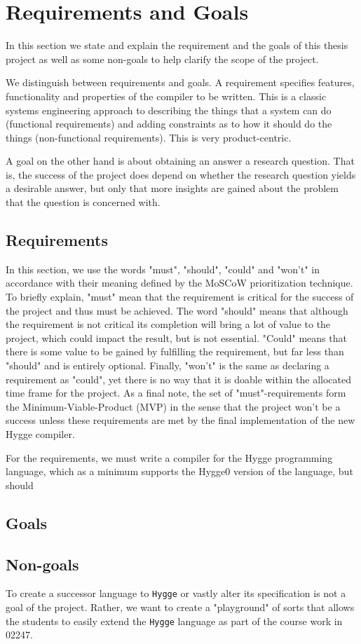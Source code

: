 \chapter{Requirements and Goals} \label{sec:requirements}

In this section we state and explain the requirement and the goals of this thesis project as well as some non-goals to help clarify the scope
of the project.

We distinguish between requirements and goals. A requirement specifies features, functionality and properties of the compiler to be written.
This is a classic systems engineering approach to describing the things that a system can do (functional requirements) and adding constraints as
to how it should do the things (non-functional requirements). This is very product-centric.

A goal on the other hand is about obtaining an answer a research question. That is, the success of the project does depend on whether the research
question yields a desirable answer, but only that more insights are gained about the problem that the question is concerned with.

\section{Requirements}

In this section, we use the words "must", "should", "could" and "won't" in accordance with their meaning defined by the MoSCoW prioritization
technique. To briefly explain, "must" mean that the requirement is critical for the success of the project and thus must be achieved. The
word "should" means that although the requirement is not critical its completion will bring a lot of value to the project, which could impact
the result, but is not essential. "Could" means that there is some value to be gained by fulfilling the requirement, but far less than "should"
and is entirely optional.
Finally, "won't" is the same as declaring a requirement as "could", yet there is no way that it is doable within the allocated time frame for the project.
As a final note, the set of "must"-requirements form the Minimum-Viable-Product (MVP) in the sense that the project won't be a success unless these
requirements are met by the final implementation of the new Hygge compiler.

For the requirements, we must write a compiler for the Hygge programming language, which as a minimum supports the Hygge0 version of the language,
but should

\section{Goals}

\section{Non-goals}

To create a successor language to \texttt{Hygge} or vastly alter its specification is not a goal of the project. Rather, we want to create a
"playground" of sorts that allows the students to easily extend the \texttt{Hygge} language as part of the course work in 02247. 
